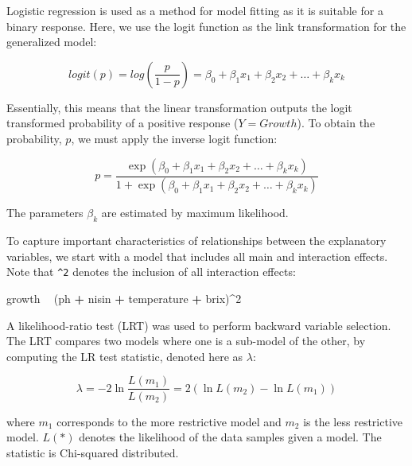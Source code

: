 \documentclass[
  12pt,
]{article}
\newenvironment{Shaded}{\begin{snugshade}}{\end{snugshade}}
\newcommand{\DecValTok}[1]{\textcolor[rgb]{0.00,0.00,0.81}{#1}}
\newcommand{\NormalTok}[1]{#1}
\newcommand{\OperatorTok}[1]{\textcolor[rgb]{0.81,0.36,0.00}{\textbf{#1}}}
\newcommand{\StringTok}[1]{\textcolor[rgb]{0.31,0.60,0.02}{#1}}
\begin{document}
Logistic regression is used as a method for model fitting as it is
suitable for a binary response. Here, we use the logit function as the
link transformation for the generalized model:

\begin{equation}
logit(p) = log(\frac{p}{1-p}) = \beta_0 + \beta_1x_1 + \beta_2x_2 + \dots + \beta_kx_k
\end{equation}

Essentially, this means that the linear transformation outputs the logit
transformed probability of a positive response (\(Y=Growth\)). To obtain
the probability, \(p\), we must apply the inverse logit function:

\begin{equation}
p = \frac{\exp(\beta_0 + \beta_1x_1 + \beta_2x_2 + \dots + \beta_kx_k)}{1 + \exp(\beta_0 + \beta_1x_1 + \beta_2x_2 + \dots + \beta_kx_k)}
\end{equation}

The parameters \(\beta_k\) are estimated by maximum likelihood.

To capture important characteristics of relationships between the
explanatory variables, we start with a model that includes all main and
interaction effects. Note that \texttt{\^{}2} denotes the inclusion of
all interaction effects:

\begin{Shaded}
\begin{Highlighting}[]
\NormalTok{growth }\OperatorTok{~}\StringTok{ }\NormalTok{(ph }\OperatorTok{+}\StringTok{ }\NormalTok{nisin }\OperatorTok{+}\StringTok{ }\NormalTok{temperature }\OperatorTok{+}\StringTok{ }\NormalTok{brix)}\OperatorTok{^}\DecValTok{2}
\end{Highlighting}
\end{Shaded}

A likelihood-ratio test (LRT) was used to perform backward variable
selection. The LRT compares two models where one is a sub-model of the
other, by computing the LR test statistic, denoted here as \(\lambda\):

\begin{equation}
\lambda = -2\ln{\frac{L(m_1)}{L(m_2)}} = 2(\ln{L(m_2)} - \ln{L(m_1)})
\end{equation}

where \(m_1\) corresponds to the more restrictive model and \(m_2\) is
the less restrictive model. \(L(*)\) denotes the likelihood of the data
samples given a model. The statistic is Chi-squared distributed.
\end{document}
